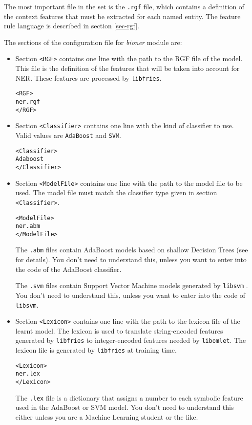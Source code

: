 \documentclass[a4paper]{book}
\begin{document}
  The most important file in the set is the {\tt .rgf} file, which contains
  a definition of the context features that must be extracted for each
  named entity.  
  The feature rule language is described in section \ref{sec-rgf}.

  The sections of the configuration file for {\sl bioner} module are:
\begin{itemize}
  \item Section \verb#<RGF># contains one line with the path to the
    RGF file of the model. This file is the definition of the features
    that will be taken into account for NER.  These features are
    processed by {\tt libfries}.
\begin{verbatim}
<RGF>
ner.rgf
</RGF>
\end{verbatim}

  \item Section \verb#<Classifier># contains one line with the kind of
    classifier to use. Valid values are \verb#AdaBoost# and
    \verb#SVM#.
\begin{verbatim}
<Classifier>
Adaboost
</Classifier>
\end{verbatim}

  \item Section \verb#<ModelFile># contains one line with the path to
    the model file to be used. The model file must match the
    classifier type given in section \verb#<Classifier>#.
\begin{verbatim}
<ModelFile>
ner.abm
</ModelFile>
\end{verbatim}
  The {\tt .abm} files contain AdaBoost models based on shallow
  Decision Trees (see \cite{carreras03} for details). You don't need
  to understand this, unless you want to enter into the code of the
  AdaBoost classifier.

  The {\tt .svm} files contain Support Vector Machine models generated
  by {\tt libsvm} \cite{chang11}. You don't need to understand this, unless you want 
  to enter into the code of {\tt libsvm}.

\item Section \verb#<Lexicon># contains one line with the path to the
  lexicon file of the learnt model. The lexicon is used to translate
  string-encoded features generated by {\tt libfries} to
  integer-encoded features needed by {\tt libomlet}. The lexicon file
  is generated by {\tt libfries} at training time.
\begin{verbatim}
<Lexicon>
ner.lex
</Lexicon>
\end{verbatim}
  The {\tt .lex} file is a dictionary that assigns a number to each
  symbolic feature used in the AdaBoost or SVM model. You don't need to
  understand this either unless you are a Machine Learning student or
  the like.


\end{itemize}
\end{document}
